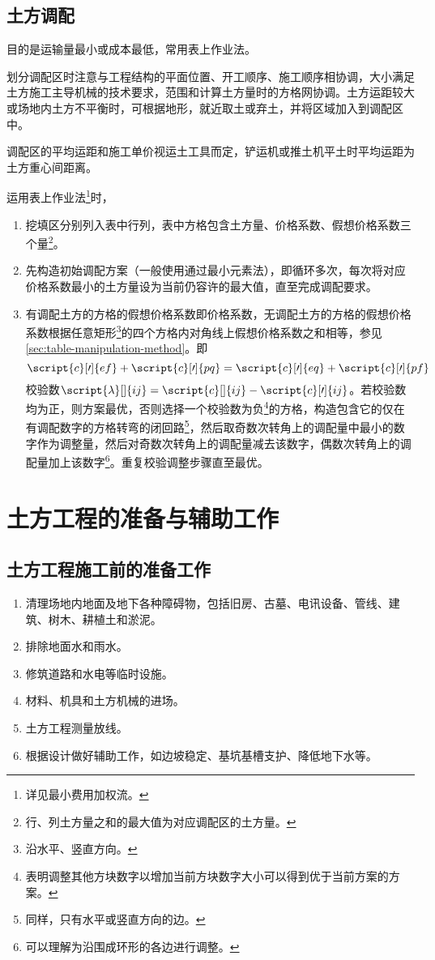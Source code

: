 \documentclass{book}
\begin{document}
\subsection{土方调配}
\par 目的是运输量最小或成本最低，常用表上作业法。
\par 划分调配区时注意与工程结构的平面位置、开工顺序、施工顺序相协调，大小满足土方施工主导机械的技术要求，范围和计算土方量时的方格网协调。土方运距较大或场地内土方不平衡时，可根据地形，就近取土或弃土，并将区域加入到调配区中。
\par 调配区的平均运距和施工单价视运土工具而定，铲运机或推土机平土时平均运距为土方重心间距离。
\par 运用表上作业法\footnote{详见最小费用加权流。}时，
\begin{enumerate}
    \item 挖填区分别列入表中行列，表中方格包含土方量、价格系数、假想价格系数三个量\footnote{行、列土方量之和的最大值为对应调配区的土方量。}。
    \item 先构造初始调配方案（一般使用通过最小元素法），即循环多次，每次将对应价格系数最小的土方量设为当前仍容许的最大值，直至完成调配要求。
    \item 有调配土方的方格的假想价格系数即价格系数，无调配土方的方格的假想价格系数根据任意矩形\footnote{沿水平、竖直方向。}的四个方格内对角线上假想价格系数之和相等，参见\cref{sec:table-manipulation-method}。即
          $$
              \script{c}[\prime]{ef} + \script{c}[\prime]{pq} = \script{c}[\prime]{eq} + \script{c}[\prime]{pf}
          $$
          校验数$\script{\lambda}[]{ij} = \script{c}[]{ij} - \script{c}[\prime]{ij}$。若校验数均为正，则方案最优，否则选择一个校验数为负\footnote{表明调整其他方块数字以增加当前方块数字大小可以得到优于当前方案的方案。}的方格，构造包含它的仅在有调配数字的方格转弯的闭回路\footnote{同样，只有水平或竖直方向的边。}，然后取奇数次转角上的调配量中最小的数字作为调整量，然后对奇数次转角上的调配量减去该数字，偶数次转角上的调配量加上该数字\footnote{可以理解为沿围成环形的各边进行调整。}。重复校验调整步骤直至最优。
\end{enumerate}
\section{土方工程的准备与辅助工作}
\subsection{土方工程施工前的准备工作}
\begin{enumerate}
    \item 清理场地内地面及地下各种障碍物，包括旧房、古墓、电讯设备、管线、建筑、树木、耕植土和淤泥。
    \item 排除地面水和雨水。
    \item 修筑道路和水电等临时设施。
    \item 材料、机具和土方机械的进场。
    \item 土方工程测量放线。
    \item 根据设计做好辅助工作，如边坡稳定、基坑基槽支护、降低地下水等。
\end{enumerate}
\end{document}
